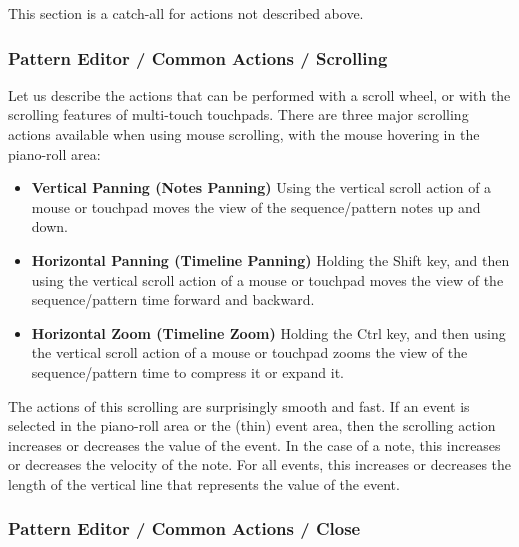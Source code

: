    This section is a catch-all for actions not described above.

\subsubsection{Pattern Editor / Common Actions / Scrolling}
\label{subsec:seq64_pattern_editor_scrolling}

   Let us describe the actions that can be performed with a
   scroll wheel, or with the scrolling features of multi-touch touchpads.
   There are three major scrolling actions available when using mouse
   scrolling, with the mouse hovering in the piano-roll area:

   \begin{itemize}
      \item \textbf{Vertical Panning (Notes Panning)}
         Using the vertical scroll action of a mouse or touchpad moves the
         view of the sequence/pattern notes up and down.
      \item \textbf{Horizontal Panning (Timeline Panning)}
         Holding the Shift key, and then using the vertical scroll action of a
         mouse or touchpad moves the view of the sequence/pattern time forward
         and backward.
      \item \textbf{Horizontal Zoom (Timeline Zoom)}
         Holding the Ctrl key, and then using the vertical scroll action of a
         mouse or touchpad zooms the view of the sequence/pattern time to
         compress it or expand it.
   \end{itemize}

   The actions of this scrolling are surprisingly smooth and fast.
   If an event is selected in the piano-roll area or the (thin) event area,
   then the scrolling action increases or decreases the value of the event.
   In the case of a note, this increases or decreases the velocity of the note.
   For all events, this increases or decreases the length of the vertical line
   that represents the value of the event.

\subsubsection{Pattern Editor / Common Actions / Close}
\label{subsec:seq64_pattern_editor_close}


